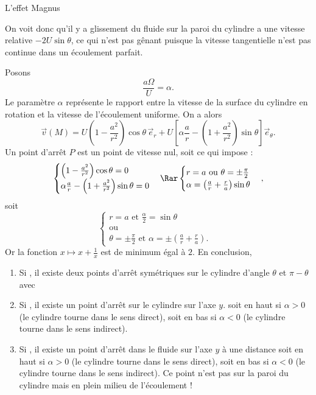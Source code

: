 \begin{exo}[PC][2][colle]{L'effet Magnus}
\begin{quest}
{$$  $$
  On voit donc qu’il y a glissement du fluide sur la paroi du cylindre a une vitesse relative $-2U \sin \theta$, ce qui n’est pas gênant puisque la vitesse tangentielle n’est pas continue dans un écoulement parfait.
  }
  {
    Posons 
    $$\frac{a\Omega}{U} = \alpha.$$ 
    Le paramètre $\alpha$ représente le rapport entre la vitesse de la surface du cylindre en rotation et la vitesse de l'écoulement uniforme. On a alors 
  $$
  \Vec{v}(M) = U\left(1-\frac{a^2}{r^2}\right)\cos\theta\,\vec{e}_r+U\left[\alpha\frac{a}{r}-\left(1+\frac{a^2}{r^2}\right)\sin\theta\right]\vec{e}_\theta.
  $$
  Un point d'arrêt $P$ est un point de vitesse nul, soit 
  ce qui impose :
  $$
  \begin{cases}
    \left(1-\frac{a^2}{r^2}\right)\cos\theta = 0 \\
  \alpha\frac{a}{r}-\left(1+\frac{a^2}{r^2}\right)\sin\theta = 0 
  \end{cases} \Rar 
  \begin{cases}
    r = a \text{ ou } \theta=\pm\frac{\pi}{2}\\
  \alpha = \left( \frac{a}{r} + \frac{r}{a} \right)\sin\theta 
  \end{cases},
  $$
  soit 
  $$
    \begin{cases}
    r = a \text{ et } \frac{\alpha}{2} = \sin\theta  \\
    \text{ou} & \\ 
    \theta= \pm\frac{\pi}{2}
  \text{ et } \alpha = \pm \left( \frac{a}{r} + \frac{r}{a} \right).
  \end{cases}
  $$
  Or la fonction $x \mapsto x+\frac{1}{x}$ est de minimum égal à $2$. En conclusion,
  \begin{enumerate}
    \item Si , il existe deux points d'arrêt symétriques sur le cylindre d'angle $\theta$ et $\pi-\theta$ avec
    \item Si , il existe un point d'arrêt sur le cylindre sur l'axe $y$. soit en haut si $\alpha >0$ (le cylindre tourne dans le sens direct), soit en bas si $\alpha <0$ (le cylindre tourne dans le sens indirect).
    \item Si , il existe un point d'arrêt dans le fluide sur l'axe $y$ à une distance 
    soit en haut si $\alpha >0$ (le cylindre tourne dans le sens direct), soit en bas si $\alpha <0$ (le cylindre tourne dans le sens indirect). Ce point n’est pas sur la paroi du cylindre mais en plein milieu de l’écoulement !
  \end{enumerate}


}
\end{quest}
\end{exo}
